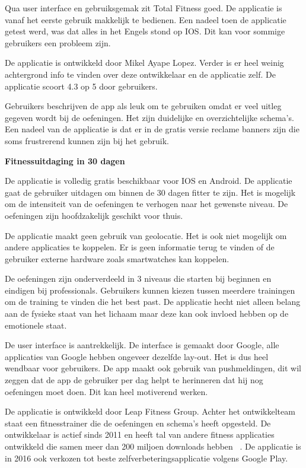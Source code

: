 Qua user interface en gebruiksgemak zit Total Fitness goed. De applicatie is vanaf het eerste gebruik makkelijk te bedienen. Een nadeel toen de applicatie getest werd, was dat alles in het Engels stond op IOS. Dit kan voor sommige gebruikers een probleem zijn.

De applicatie is ontwikkeld door Mikel Ayape Lopez. Verder is er heel weinig achtergrond info te vinden over deze ontwikkelaar en de applicatie zelf. De applicatie scoort 4.3 op 5 door gebruikers. 

Gebruikers beschrijven de app als leuk om te gebruiken omdat er veel uitleg gegeven wordt bij de oefeningen. Het zijn duidelijke en overzichtelijke schema’s. Een nadeel van de applicatie is dat er in de gratis versie reclame banners zijn die soms frustrerend kunnen zijn bij het gebruik.


\textbf{Fitnessuitdaging in 30 dagen}

De applicatie is volledig gratis beschikbaar voor IOS en Android. De applicatie gaat de gebruiker uitdagen om binnen de 30 dagen fitter te zijn. Het is mogelijk om de intensiteit van de oefeningen te verhogen naar het gewenste niveau. De oefeningen zijn hoofdzakelijk geschikt voor thuis.

De applicatie maakt geen gebruik van geolocatie. Het is ook niet mogelijk om andere applicaties te koppelen. Er is geen informatie terug te vinden of de gebruiker externe hardware zoals smartwatches kan koppelen.

De oefeningen zijn onderverdeeld in 3 niveaus die starten bij beginnen en eindigen bij professionals. Gebruikers kunnen kiezen tussen meerdere trainingen om de training te vinden die het best past. De applicatie hecht niet alleen belang aan de fysieke staat van het lichaam maar deze kan ook invloed hebben op de emotionele staat. 

De user interface is aantrekkelijk. De interface is gemaakt door Google, alle applicaties van Google hebben ongeveer dezelfde lay-out. Het is dus heel wendbaar voor gebruikers. De app maakt ook gebruik van pushmeldingen, dit wil zeggen dat de app de gebruiker per dag helpt te herinneren dat hij nog oefeningen moet doen. Dit kan heel motiverend werken.

De applicatie is ontwikkeld door Leap Fitness Group. Achter het ontwikkelteam staat een fitnesstrainer die de oefeningen en schema’s heeft opgesteld. De ontwikkelaar is actief sinds 2011 en heeft tal van andere fitness applicaties ontwikkeld die samen meer dan 200 miljoen downloads hebben ~\autocite{Appbrain2018}. De applicatie is in 2016 ook verkozen tot beste zelfverbeteringsapplicatie volgens Google Play.

